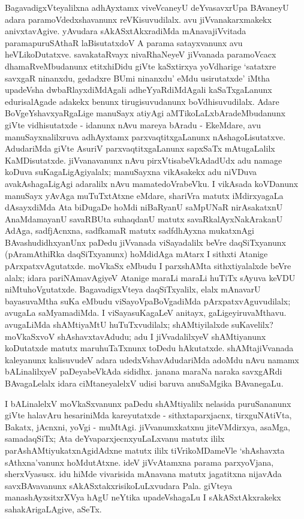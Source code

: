 BagavadigxVteyalilxna adhAyxtamx viveVcaneyU deYvasavxrUpa BAvaneyU adara paramoVdedxshavanunx reVKisuvudilalx. avu jiVvanakarxmakekx anivxtavAgive. yAvudara sAkASxtAkxradiMda mAnavajiVvitada paramapuruSAthaR laBisutatxdoV A parama satayxvanunx avu heVLikoDutatxve. savakataRvayx nivaRhaNeyeV jiVvanada paramoVcacx dhamaRveMbudanunx etitxhiDidu giVte kaSxtirxya yoVdharige `satatxre savxgaR ninanxdu, gedadxre BUmi ninanxdu' eMdu usirutatxde' iMtha upadeVsha dwbaRlayxdiMdAgali adheYyaR\-diMdAgali kaSaTxgaLanunx edurisalAgade adakekx benunx tirugisuvudanunx boVdhisuvudilalx. Adare BoVgeYshavxyaRgaLige manuSayx atiyAgi aMTikoLaLxbAradeMbudanunx giVte vidhisutatxde - idanunx nAvu mareya bAradu - EkeMdare, avu manuSayxnalilxruva adhAyxtamx parxvaqtitxgaLanunx nAshagoLisutatxve. AdudariMda giVte AsuriV parxvaqtitxgaLanunx sapxSaTx mAtugaLalilx KaMDisutatxde. jiVvanavanunx nAvu pirxVtisabeVkAdadUdx adu namage koDuva suKagaLigAgiyalalx; manuSayxna vikAsakekx adu niVDuva avakAshagaLigAgi adaralilx nAvu mamatedoVrabeVku. I vikAsada koVDanunx manuSayx yAvAga muTuTxtAtxne eMdare, shariVra matutx iMdirxyagaLa dAsayxdiMda Ata biDugaDe hoMdi niBaRyanU saMpUNaR nirAsakatxnU AnaMdamayanU savaRBUta suhaqdanU matutx savaRkalAyxNakArakanU AdAga, sadfjAcnxna, sadfkamaR matutx sadfdhAyxna mukatxnAgi BAvashudidhxyanUnx paDedu jiVvanada viSayadalilx beVre daqSiTxyanunx (pAramAthiRka daqSiTxyanunx) hoMdidAga mAtarx I sithxti Atanige pArxpatxvAgutatxde. moVkaSx eMbudu I parxshAMta sithxtiyalalxde beVre alalx; idara pariNAmavAgiyeV Atanige maraLi maraLi huTiTx sAyuva keVDU niMtuhoVgutatxde. BagavadigxVteya daqSiTxyalilx, elalx mAnavarU bayasuvaMtha suKa eMbudu viSayoVpaBoVgadiMda pArxpatxvAguvudilalx; avugaLa saMyamadiMda. I viSayasuKagaLeV anitayx, gaLigeyiruvaMthavu. avugaLiMda shAMtiyaMtU huTuTxvudilalx; shAMtiyilalxde suKavelilx? moVkaSxvoV shAshavxtavAdudu; adu I jiVvadalilxyeV shAMtiyanunx koDutatxde matutx maruhuTaTxnunx toDedu hAkutatxde. shAMtajiVvanada kaleyanunx kalisuvudeV adara udedxVshavAdudariMda adoMdu nAvu namamx bALinalilxyeV paDeyabeVkAda sididhx. janana maraNa naraka savxgARdi BAvagaLelalx idara ciMtaneyalelxV udisi baruva anuSaMgika BAvanegaLu.

I bALinalelxV moVkaSxvanunx paDedu shAMtiyalilx nelasida puruSananunx giVte halavAru hesariniMda kareyutatxde - sithxtaparxjacnx, tirxguNAtiVta, Bakatx, jAcnxni, yoVgi - muMtAgi. jiVvanumxkatxnu jiteVMdirxya, asaMga, samadaqSiTx; Ata deYvaparxjecnxyuLaLxvanu matutx ililx parAshAMtiyukatxnAgidAdxne matutx ililx tiVrikoMDameVle `shAshavxta sAthxna'vanunx hoMdutAtxne. ideV jiVvAtamxna parama parxyoVjana, sherxVyasusx. idu hiMde vivarisida mAnavana matutx jagatitxna nijavAda savxBAvavanunx sAkASxtakxrisikoLuLxvudara Pala. giVteya manashAyxsitxrXVya hAgU neYtika upadeVshagaLu I sAkASxtAkxrakekx sahakArigaLAgive, aSeTx.

